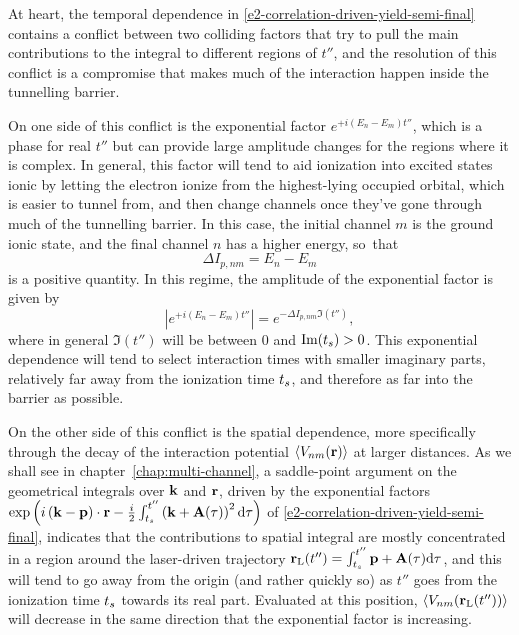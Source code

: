 At heart, the temporal dependence in \eqref{e2-correlation-driven-yield-semi-final} contains a conflict between two colliding factors that try to pull the main contributions to the integral to different regions of $t''$, and the resolution of this conflict is a compromise that makes much of the interaction happen inside the tunnelling barrier.

On one side of this conflict is the exponential factor $e^{+i(E_n-E_m)t''}$, which is a phase for real $t''$ but can provide large amplitude changes for the regions where it is complex. In general, this factor will tend to aid ionization into excited states ionic by letting the electron ionize from the highest-lying occupied orbital, which is easier to tunnel from, and then change channels once they've gone through much of the tunnelling barrier. In this case, the initial channel $m$ is the ground ionic state, and the final channel $n$ has a higher energy, so~that
\begin{equation}
\Delta I_{p,nm}=E_n-E_m
\end{equation}
is a positive quantity. In this regime, the amplitude of the exponential factor is given by
\begin{equation}
\left|e^{+i(E_n-E_m)t''}\right|
=
e^{-\Delta I_{p,nm}\Im(t'')},
\end{equation}
where in general $\Im(t'')$ will be between 0 and $\Im({t_s})>0$. This exponential dependence will tend to select interaction times with smaller imaginary parts, relatively far away from the ionization time ${t_s}$, and therefore as far into the barrier as possible.


On the other side of this conflict is the spatial dependence, more specifically through the decay of the interaction potential $\left\langle V_{nm}\mathopen{}\left( \vb{r} \right)\mathclose{} \right\rangle$ at larger distances. As we shall see in chapter~\ref{chap:multi-channel}, a saddle-point argument on the geometrical integrals over $\vb{k}$ and $\vb{r}$, driven by the exponential factors $\exp\left(i\left( \vb{k}- \vb{p}\right) \cdot\vb{r}-\frac{i}{2} \int_{{t_s}}^{t''} \left(\vb{k} + \vb{A}(\tau) \right)^2\mathrm{d}\tau\right)$ of \eqref{e2-correlation-driven-yield-semi-final}, indicates that the contributions to spatial integral are mostly concentrated in a region around the laser-driven trajectory $\vb{r}_\mathrm{L}(t'') = \int_{{t_s}}^{t''} \vb{p}+\vb{A}(\tau)\mathrm{d}\tau$, and this will tend to go away from the origin (and rather quickly so) as $t''$ goes from the ionization time ${t_s}$ towards its real part. Evaluated at this position, $\left\langle V_{nm}\mathopen{}\left( \vb{r}_\mathrm{L}(t'') \right)\mathclose{} \right\rangle$ will decrease in the same direction that the exponential factor is increasing. 

